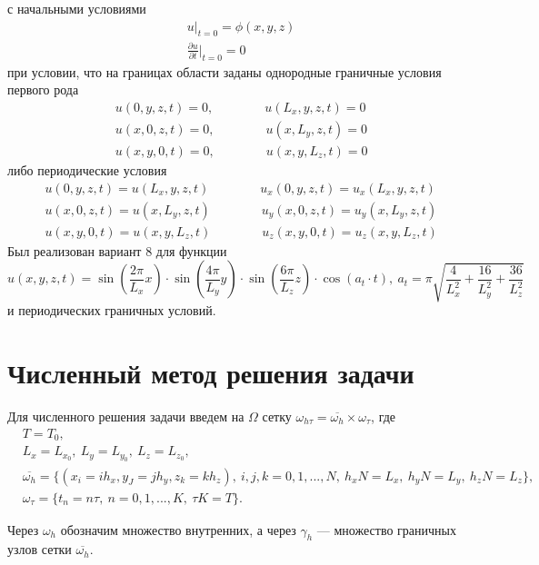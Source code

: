 \documentclass[oneside, final, 12pt]{extarticle}
\begin{document}
с начальными условиями
\begin{align}
& u|_{t = 0} = \phi(x, y, z) \label{eqn:condition1} \\
& \frac{\partial u}{\partial t}|_{t = 0} = 0 \label{eqn:condition2}
\end{align}
при условии, что на границах области заданы однородные граничные условия первого рода
\begin{align}
& u(0, y, z, t) = 0, \qquad \qquad u(L_x, y, z, t) = 0 \\
& u(x, 0, z, t) = 0, \qquad \qquad u(x, L_y, z, t) = 0 \\
& u(x, y, 0, t) = 0, \qquad \qquad u(x, y, L_z, t) = 0
\end{align}
либо периодические условия
\begin{align}
& u(0, y, z, t) = u(L_x, y, z, t) \qquad \qquad u_x(0, y, z, t) = u_x(L_x, y, z, t) \label{eqn:period1} \\
& u(x, 0, z, t) = u(x, L_y, z, t) \qquad \qquad u_y(x, 0, z, t) = u_y(x, L_y, z, t) \label{eqn:period2} \\
& u(x, y, 0, t) = u(x, y, L_z, t) \qquad \qquad u_z(x, y, 0, t) = u_z(x, y, L_z, t) \label{eqn:period3}
\end{align}
Был реализован вариант 8 для функции
$$
u(x, y, z, t) = \sin(\frac{2 \pi}{L_x} x) \cdot \sin(\frac{4 \pi}{L_y} y) \cdot \sin(\frac{6 \pi}{L_z} z)
\cdot \cos(a_t \cdot t), \: a_t = \pi \sqrt{\frac{4}{L_x^2} + \frac{16}{L_y^2} + \frac{36}{L_z^2}} 
$$
и периодических граничных условий.

\section{Численный метод решения задачи}

Для численного решения задачи введем на $ \Omega $ сетку $ \omega_{h \tau} = \overline{\omega_h} \times \omega_{\tau} $, где
\begin{align*}
& T = T_0, \\
& L_x = L_{x_0}, \: L_y = L_{y_0}, \: L_z = L_{z_0}, \\
& \overline{\omega_h} = \{ ( x_i = i h_x, y_J = j h_y, z_k = k h_z ), \: i, j, k = 0, 1, ..., N, \: h_x N = L_x, \: h_y N = L_y, \: h_z N = L_z \}, \\
& \omega_{\tau} = \{ t_n = n \tau, \: n = 0, 1, ..., K, \: \tau K = T \}.
\end{align*}

Через $ \omega_h $ обозначим множество внутренних, а через $ \gamma_h $ --- множество граничных узлов сетки $ \overline{\omega_h} $.
\end{document}
